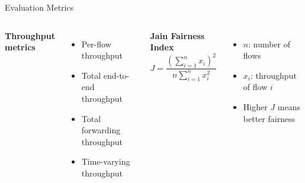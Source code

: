 \begin{frame}{Evaluation Metrics}

\begin{columns}[T,onlytextwidth]
\textbf{Throughput metrics}
\begin{itemize}
    \item Per-flow throughput
    \item Total end-to-end throughput
    \item Total forwarding throughput
    \item Time-varying throughput
\end{itemize}

\textbf{Jain Fairness Index}
\[
J=\frac{\left(\sum_{i=1}^{n}x_i\right)^2}{n\sum_{i=1}^{n}x_i^2}
\]
\begin{itemize}
    \item $n$: number of flows
    \item $x_i$: throughput of flow $i$
    \item Higher $J$ means better fairness
\end{itemize}
\end{columns}
\end{frame}
